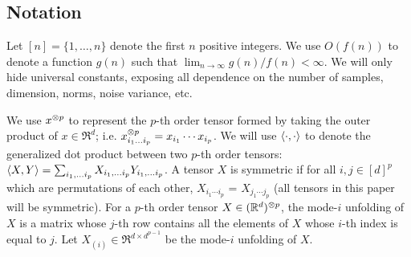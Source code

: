 




\subsection{Notation}


Let $[n] = \{ 1, \dots, n \}$ denote the first $n$ positive integers.
We use $O(f(n))$ to denote a function $g(n)$ such that $\lim_{n \to\infty} g(n)/f(n) < \infty$.
We will only hide universal constants, exposing all dependence on the number of samples,
dimension, norms, noise variance, etc.

We use $x^{\otimes p}$ to represent the $p$-th order tensor formed by taking
the outer product of $x \in \Re^d$; i.e. $x^{\otimes p}_{i_1 \ldots i_p}
= x_{i_1} \cdots x_{i_p}$. We will use $\langle \cdot, \cdot \rangle$ to denote
the generalized dot product between two $p$-th order tensors:
$\langle X, Y \rangle = \sum_{i_1, \ldots i_p} X_{i_1, \ldots i_p} Y_{i_1,
\ldots i_p}$.  A tensor $X$ is symmetric if for all $i,j \in [d]^p$
which are permutations of each other, $X_{i_1 \cdots i_p}$ = $X_{j_1
\cdots j_p}$ (all tensors in this paper will be symmetric).  For
a $p$-th order tensor $X \in (\mathbb{R}^d)^{\otimes p}$, the mode-$i$ unfolding of
$X$ is a matrix whose $j$-th row contains all the elements of $X$ whose
$i$-th index is equal to $j$. Let $X_{(i)} \in \Re^{d \times d^{p-1}}$
be the mode-$i$ unfolding of $X$.

